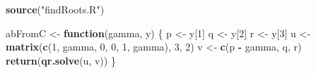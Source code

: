 \documentclass[
  12pt,
]{article}
\newenvironment{Shaded}{\begin{snugshade}}{\end{snugshade}}
\newcommand{\ControlFlowTok}[1]{\textcolor[rgb]{0.13,0.29,0.53}{\textbf{#1}}}
\newcommand{\DecValTok}[1]{\textcolor[rgb]{0.00,0.00,0.81}{#1}}
\newcommand{\FunctionTok}[1]{\textcolor[rgb]{0.13,0.29,0.53}{\textbf{#1}}}
\newcommand{\NormalTok}[1]{#1}
\newcommand{\OtherTok}[1]{\textcolor[rgb]{0.56,0.35,0.01}{#1}}
\newcommand{\SpecialCharTok}[1]{\textcolor[rgb]{0.81,0.36,0.00}{\textbf{#1}}}
\newcommand{\StringTok}[1]{\textcolor[rgb]{0.31,0.60,0.02}{#1}}
\begin{document}
\begin{Shaded}
\begin{Highlighting}[]
\FunctionTok{source}\NormalTok{(}\StringTok{"findRoots.R"}\NormalTok{)}

\NormalTok{abFromC }\OtherTok{\textless{}{-}} \ControlFlowTok{function}\NormalTok{(gamma, y) \{}
\NormalTok{  p }\OtherTok{\textless{}{-}}\NormalTok{ y[}\DecValTok{1}\NormalTok{]}
\NormalTok{  q }\OtherTok{\textless{}{-}}\NormalTok{ y[}\DecValTok{2}\NormalTok{]}
\NormalTok{  r }\OtherTok{\textless{}{-}}\NormalTok{ y[}\DecValTok{3}\NormalTok{]}
\NormalTok{  u }\OtherTok{\textless{}{-}} \FunctionTok{matrix}\NormalTok{(}\FunctionTok{c}\NormalTok{(}\DecValTok{1}\NormalTok{, gamma, }\DecValTok{0}\NormalTok{, }\DecValTok{0}\NormalTok{, }\DecValTok{1}\NormalTok{, gamma), }\DecValTok{3}\NormalTok{, }\DecValTok{2}\NormalTok{)}
\NormalTok{  v }\OtherTok{\textless{}{-}} \FunctionTok{c}\NormalTok{(p }\SpecialCharTok{{-}}\NormalTok{ gamma, q, r)}
  \FunctionTok{return}\NormalTok{(}\FunctionTok{qr.solve}\NormalTok{(u, v))}
\NormalTok{\}}


\end{Highlighting}
\end{Shaded}
\end{document}
